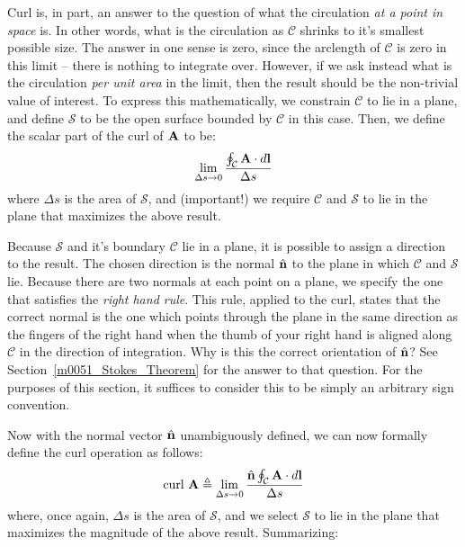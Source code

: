 
Curl is, in part, an answer to the question of what the circulation \emph{at a point in space} is.
In other words, what is the circulation as ${\mathcal C}$ shrinks to it's smallest possible size.  
The answer in one sense is zero, since the arclength of ${\mathcal C}$ is zero in this limit -- there is nothing to integrate over.
However, if we ask instead what is the circulation \emph{per unit area} in the limit, then the result should be the non-trivial value of interest. 
To express this mathematically, we constrain ${\mathcal C}$ to lie in a plane, and define ${\mathcal S}$ to be the open surface bounded by ${\mathcal C}$ in this case.
Then, we define the scalar part of the curl of ${\bf A}$ to be:
%
\begin{equation}
\lim_{\Delta s \to 0} \frac{\oint_{\mathcal C} {\bf A}\cdot d{\bf l}}{\Delta s}
\end{equation}
%
where $\Delta s$ is the area of ${\mathcal S}$, and (important!) we require ${\mathcal C}$ and ${\mathcal S}$ to lie in the plane that maximizes the above result. 

Because ${\mathcal S}$ and it's boundary ${\mathcal C}$ lie in a plane, it is possible to assign a direction to the result.
The chosen direction is the normal $\hat{\bf n}$ to the plane in which ${\mathcal C}$ and ${\mathcal S}$ lie.
Because there are two normals at each point on a plane, we specify the one that satisfies the \emph{right hand rule}.
This rule, applied to the curl, states that the correct normal is the one which points through the plane in the same direction as the fingers of the right hand when the thumb of your right hand is aligned along ${\mathcal C}$ in the direction of integration.
Why is this the correct orientation of $\hat{\bf n}$?  
See Section~\ref{m0051_Stokes_Theorem} for the answer to that question.
For the purposes of this section, it suffices to consider this to be simply an arbitrary sign convention.
  
Now with the normal vector $\hat{\bf n}$ unambiguously defined, we can now formally define the curl operation as follows:
%
\begin{equation}
\mbox{curl}~{\bf A} \triangleq \lim_{\Delta s \to 0} \frac{\hat{\bf n}\oint_{\mathcal C} {\bf A}\cdot d{\bf l}}{\Delta s}
\label{m0048_eCurlDef}
\end{equation}
%
where, once again, $\Delta s$ is the area of ${\mathcal S}$, and we select ${\mathcal S}$ to lie in the plane that maximizes the magnitude of the above result.  Summarizing:

